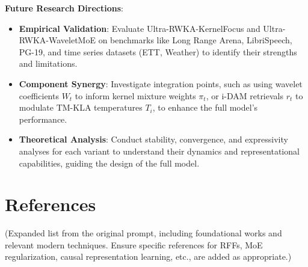 \documentclass{article}
\begin{document}
\textbf{Future Research Directions}:
\begin{itemize}
    \item \textbf{Empirical Validation}: Evaluate Ultra-RWKA-KernelFocus and Ultra-RWKA-WaveletMoE on benchmarks like Long Range Arena, LibriSpeech, PG-19, and time series datasets (ETT, Weather) to identify their strengths and limitations.
    \item \textbf{Component Synergy}: Investigate integration points, such as using wavelet coefficients $W_t$ to inform kernel mixture weights $\pi_t$, or i-DAM retrievals $r_t$ to modulate TM-KLA temperatures $T_i$, to enhance the full model's performance.
    \item \textbf{Theoretical Analysis}: Conduct stability, convergence, and expressivity analyses for each variant to understand their dynamics and representational capabilities, guiding the design of the full model.
\end{itemize}




\section*{References}
(Expanded list from the original prompt, including foundational works and relevant modern techniques. Ensure specific references for RFFs, MoE regularization, causal representation learning, etc., are added as appropriate.)
\end{document}
